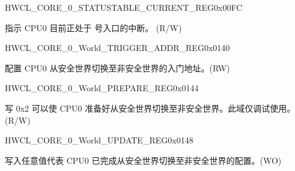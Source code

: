 \begin{register}{H}{WCL\_CORE\_0\_STATUSTABLE\_CURRENT\_REG}{0x00FC}\label{regdesc:WCLCORE0STATUSTABLECURRENTREG}
%
%
%
\regnewline%
\begin{regdesc}\begin{reglist}
\label{fielddesc:WCLCORE0STATUSTABLECURRENT}\item [WCL\_CORE\_0\_STATUSTABLE\_CURRENT] 指示 CPU0 目前正处于  号入口的中断。 (R/W)
\end{reglist}\end{regdesc}
\end{register}

\begin{register}{H}{WCL\_CORE\_0\_World\_TRIGGER\_ADDR\_REG}{0x0140}\label{regdesc:WCLCORE0WORLDTRIGGERADDRREG}
%
\regnewline%
\begin{regdesc}\begin{reglist}
\label{fielddesc:WCLCORE0WORLDTRIGGERADDR}\item [WCL\_CORE\_0\_WORLD\_TRIGGER\_ADDR] 配置 CPU0 从安全世界切换至非安全世界的入门地址。(RW)
\end{reglist}\end{regdesc}
\end{register}


\begin{register}{H}{WCL\_CORE\_0\_World\_PREPARE\_REG}{0x0144}\label{regdesc:WCLCORE0WORLDPREPAREREG}
%
%
\regnewline%
\begin{regdesc}\begin{reglist}
\label{fielddesc:WCLCORE0WORLDPREPARE}\item [WCL\_CORE\_0\_WORLD\_PREPARE] 写 0x2 可以使 CPU0 准备好从安全世界切换至非安全世界。此域仅调试使用。(R/W)
\end{reglist}\end{regdesc}
\end{register}

\begin{register}{H}{WCL\_CORE\_0\_World\_UPDATE\_REG}{0x0148}\label{regdesc:WCLCORE0WORLDUPDATEREG}
%
\regnewline%
\begin{regdesc}\begin{reglist}
\label{fielddesc:WCLCORE0UPDATE}\item [WCL\_CORE\_0\_UPDATE] 写入任意值代表 CPU0 已完成从安全世界切换至非安全世界的配置。(WO)
\end{reglist}\end{regdesc}
\end{register}


